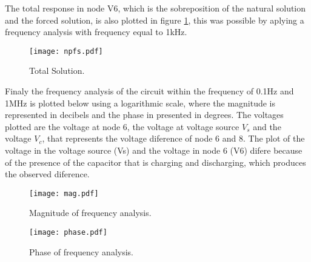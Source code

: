 The total response in node V6, which is the sobreposition of the natural solution and the forced solution, is also plotted in figure \ref{Fig1:npfs}, this was possible by aplying a frequency analysis with frequency equal to 1kHz.

\begin{figure}[H] \centering
\texttt{[image: npfs.pdf]}
\caption{Total Solution.}
\label{Fig1:npfs}
\end{figure}

Finaly the frequency analysis of the circuit within the frequency of 0.1Hz and 1MHz is plotted below using a logarithmic scale, where the magnitude is represented in decibels and the phase in presented in degrees. The voltages plotted are the voltage at node 6, the voltage at voltage source $V_s$ and the voltage $V_c$, that represents the voltage diference of node 6 and 8. The plot of the voltage in the voltage source (Vs) and the voltage in node 6 (V6) difere because of the presence of the capacitor that is charging and discharging, which produces the observed diference.

\begin{figure}[H] \centering
\texttt{[image: mag.pdf]}
\caption{Magnitude of frequency analysis.}
\label{Fig1:mag}
\end{figure}

\begin{figure}[H] \centering
\texttt{[image: phase.pdf]}
\caption{Phase of frequency analysis.}
\label{Fig1:phase}
\end{figure}
